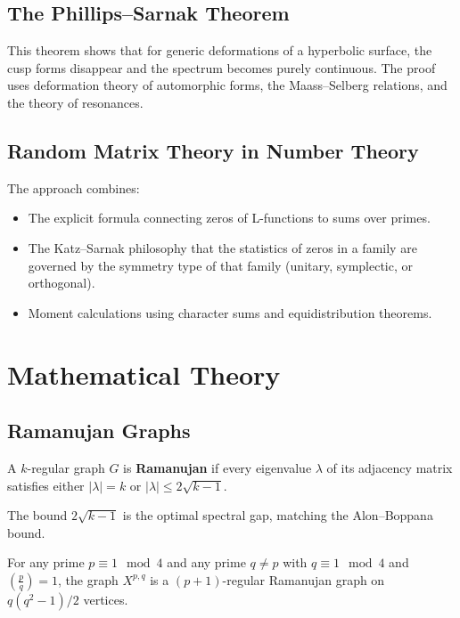 \subsection{The Phillips--Sarnak Theorem}

This theorem shows that for generic deformations of a hyperbolic surface, the cusp forms disappear and the spectrum becomes purely continuous. The proof uses deformation theory of automorphic forms, the Maass--Selberg relations, and the theory of resonances.

\subsection{Random Matrix Theory in Number Theory}

The approach combines:
\begin{itemize}
    \item The explicit formula connecting zeros of L-functions to sums over primes.
    \item The Katz--Sarnak philosophy that the statistics of zeros in a family are governed by the symmetry type of that family (unitary, symplectic, or orthogonal).
    \item Moment calculations using character sums and equidistribution theorems.
\end{itemize}

\section{Mathematical Theory}

\subsection{Ramanujan Graphs}

\begin{definition}
A $k$-regular graph $G$ is \textbf{Ramanujan} if every eigenvalue $\lambda$ of its adjacency matrix satisfies either $|\lambda| = k$ or $|\lambda| \leq 2\sqrt{k-1}$.
\end{definition}

The bound $2\sqrt{k-1}$ is the optimal spectral gap, matching the Alon--Boppana bound.

\begin{theorem}
For any prime $p \equiv 1 \mod 4$ and any prime $q \neq p$ with $q \equiv 1 \mod 4$ and $(\frac{p}{q}) = 1$, the graph $X^{p,q}$ is a $(p+1)$-regular Ramanujan graph on $q(q^2-1)/2$ vertices.
\end{theorem}

